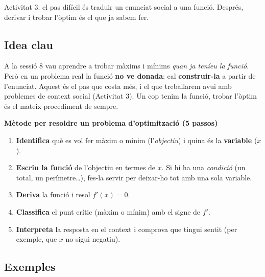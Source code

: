 %
{Activitat 3: el pas difícil és traduir un enunciat social a una funció. Després, derivar i trobar l'òptim és el que ja sabem fer.}

\subsection{Idea clau}

A la sessió 8 vau aprendre a trobar màxims i mínims \emph{quan ja teníeu la funció}.
Però en un problema real la funció \textbf{no ve donada}: cal \textbf{construir-la} a
partir de l'enunciat. Aquest és el pas que costa més, i el que treballarem avui amb
problemes de context social (Activitat 3). Un cop tenim la funció, trobar l'òptim és el
mateix procediment de sempre.

\begin{idea}
\textbf{Mètode per resoldre un problema d'optimització (5 passos)}
\begin{enumerate}[leftmargin=1.6em, itemsep=2pt]
  \item \textbf{Identifica} què es vol fer màxim o mínim (l'\emph{objectiu}) i quina és
        la \textbf{variable} ($x$).
  \item \textbf{Escriu la funció} de l'objectiu en termes de $x$. Si hi ha una
        \emph{condició} (un total, un perímetre\ldots), fes-la servir per deixar-ho tot
        amb una sola variable.
  \item \textbf{Deriva} la funció i resol $f'(x)=0$.
  \item \textbf{Classifica} el punt crític (màxim o mínim) amb el signe de $f'$.
  \item \textbf{Interpreta} la resposta en el context i comprova que tingui sentit
        (per exemple, que $x$ no sigui negatiu).
\end{enumerate}
\end{idea}

\subsection{Exemples}

